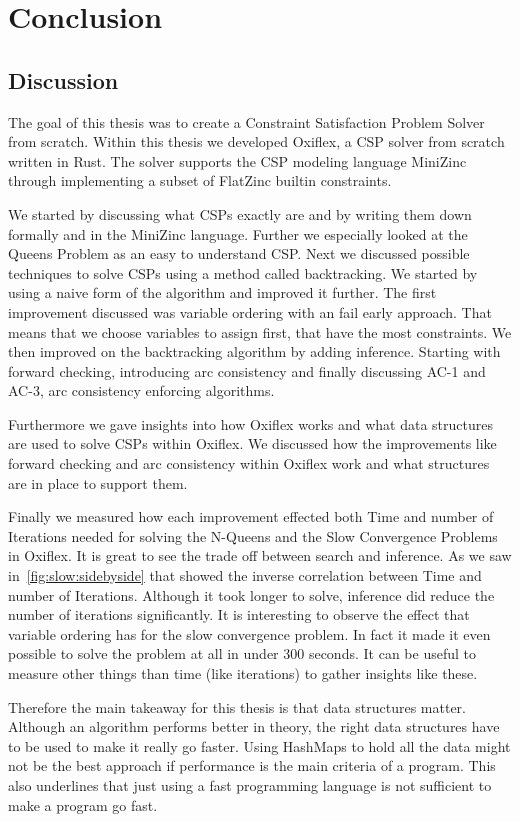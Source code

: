 
\chapter{Conclusion} \label{chap:conclusion}

\section{Discussion}

The goal of this thesis was to create a Constraint Satisfaction Problem Solver from scratch. Within this thesis we developed Oxiflex, a CSP solver from scratch written in Rust. The solver supports the CSP modeling language MiniZinc through implementing a subset of FlatZinc builtin constraints.

We started by discussing what CSPs exactly are and by writing them down formally and in the MiniZinc language. Further we especially looked at the Queens Problem as an easy to understand CSP. Next we discussed possible techniques to solve CSPs using a method called backtracking. We started by using a naive form of the algorithm and improved it further. The first improvement discussed was variable ordering with an fail early approach. That means that we choose variables to assign first, that have the most constraints. We then improved on the backtracking algorithm by adding inference. Starting with forward checking, introducing arc consistency and finally discussing AC-1 and AC-3, arc consistency enforcing algorithms.

Furthermore we gave insights into how Oxiflex works and what data structures are used to solve CSPs within Oxiflex. We discussed how the improvements like forward checking and arc consistency within Oxiflex work and what structures are in place to support them.

Finally we measured how each improvement effected both Time and number of Iterations needed for solving the N-Queens and the Slow Convergence Problems in Oxiflex. It is great to see the trade off between search and inference. As we saw in~\cref{fig:slow:sidebyside} that showed the inverse correlation between Time and number of Iterations. Although it took longer to solve, inference did reduce the number of iterations significantly. It is interesting to observe the effect that variable ordering has for the slow convergence problem. In fact it made it even possible to solve the problem at all in under 300 seconds. It can be useful to measure other things than time (like iterations) to gather insights like these.

Therefore the main takeaway for this thesis is that data structures matter. Although an algorithm performs better in theory, the right data structures have to be used to make it really go faster. Using HashMaps to hold all the data might not be the best approach if performance is the main criteria of a program. This also underlines that just using a fast programming language is not sufficient to make a program go fast.

